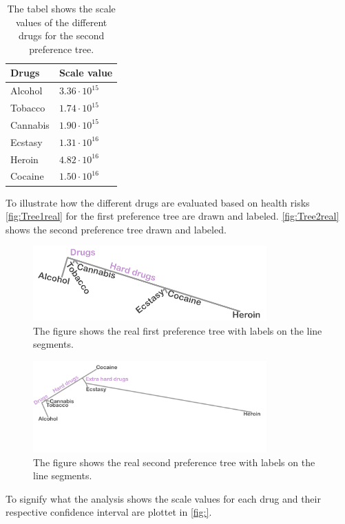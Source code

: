 \begin{table}[H]
	\centering
	\begin{tabular}{@{}ll@{}}
		\toprule
		Drugs     & Scale value \\ \midrule
		Alcohol	  & $3.36\cdot10^{15}$   \\
		Tobacco	  & $1.74\cdot10^{15}$   \\
		Cannabis	  & $1.90\cdot10^{15}$   \\
		Ecstasy	  & $1.31\cdot10^{16}$   \\
		Heroin	  & $4.82\cdot10^{16}$   \\
		Cocaine	  & $1.50\cdot10^{16}$   \\	\bottomrule
	\end{tabular}
	\caption{The tabel shows the scale values of the different drugs for the second preference tree.}
	\label{tab:ScaleValues2}
\end{table} 
\noindent 
%
To illustrate how the different drugs are evaluated based on health risks \autoref{fig:Tree1real} for the first preference tree are drawn and labeled. \autoref{fig:Tree2real} shows the second preference tree drawn and labeled. 
%
\begin{figure}[H]
\centering
\includegraphics[width = 0.80\textwidth]{Figure/Tree1real}
\caption{The figure shows the real first preference tree with labels on the line segments.}
\label{fig:Tree1real}
\end{figure}
\noindent
%
\begin{figure}[H]
	\centering
	\includegraphics[width = 0.80\textwidth]{Figure/Tree2real}
	\caption{The figure shows the real second preference tree with labels on the line segments.}
	\label{fig:Tree2real}
\end{figure}
\noindent
%
To signify what the analysis shows the scale values for each drug and their respective confidence interval are plottet in \autoref{fig:}.

